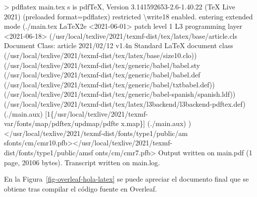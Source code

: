 \documentclass[
  letterpaper,
  DIV=11,
  numbers=noendperiod]{scrreport}
\newenvironment{Shaded}{\begin{snugshade}}{\end{snugshade}}
\newcommand{\BuiltInTok}[1]{\textcolor[rgb]{0.00,0.23,0.31}{#1}}
\newcommand{\DataTypeTok}[1]{\textcolor[rgb]{0.68,0.00,0.00}{#1}}
\newcommand{\ErrorTok}[1]{\textcolor[rgb]{0.68,0.00,0.00}{#1}}
\newcommand{\ExtensionTok}[1]{\textcolor[rgb]{0.00,0.23,0.31}{#1}}
\newcommand{\KeywordTok}[1]{\textcolor[rgb]{0.00,0.23,0.31}{#1}}
\newcommand{\NormalTok}[1]{\textcolor[rgb]{0.00,0.23,0.31}{#1}}
\newcommand{\OperatorTok}[1]{\textcolor[rgb]{0.37,0.37,0.37}{#1}}
\begin{document}
\begin{Shaded}
\begin{Highlighting}[]
\OperatorTok{\textgreater{}}\NormalTok{ pdflatex }\ExtensionTok{main.tex} 
\ExtensionTok{s}\NormalTok{ is pdfTeX, Version 3.141592653{-}2.6{-}1.40.22 }\ErrorTok{(}\ExtensionTok{TeX}\NormalTok{ Live 2021}\KeywordTok{)} \KeywordTok{(}\ExtensionTok{preloaded}\NormalTok{ format=pdflatex}\KeywordTok{)}
 \ExtensionTok{restricted} \DataTypeTok{\textbackslash{}w}\NormalTok{rite18 enabled.}
\ExtensionTok{entering}\NormalTok{ extended mode}
\KeywordTok{(}\ExtensionTok{./main.tex}
\ExtensionTok{LaTeX2e} \OperatorTok{\textless{}}\NormalTok{2021{-}06{-}01}\OperatorTok{\textgreater{}}\NormalTok{ patch level 1}
\ExtensionTok{L3}\NormalTok{ programming layer }\OperatorTok{\textless{}}\NormalTok{2021{-}06{-}18}\OperatorTok{\textgreater{}}
\KeywordTok{(}\ExtensionTok{/usr/local/texlive/2021/texmf{-}dist/tex/latex/base/article.cls}
\ExtensionTok{Document}\NormalTok{ Class: article 2021/02/12 v1.4n Standard LaTeX document class}
\KeywordTok{(}\ExtensionTok{/usr/local/texlive/2021/texmf{-}dist/tex/latex/base/size10.clo}\KeywordTok{))}
\KeywordTok{(}\ExtensionTok{/usr/local/texlive/2021/texmf{-}dist/tex/generic/babel/babel.sty}
\KeywordTok{(}\ExtensionTok{/usr/local/texlive/2021/texmf{-}dist/tex/generic/babel/babel.def}
\KeywordTok{(}\ExtensionTok{/usr/local/texlive/2021/texmf{-}dist/tex/generic/babel/txtbabel.def}\KeywordTok{))}
\KeywordTok{(}\ExtensionTok{/usr/local/texlive/2021/texmf{-}dist/tex/generic/babel{-}spanish/spanish.ldf}\KeywordTok{))}
\KeywordTok{(}\ExtensionTok{/usr/local/texlive/2021/texmf{-}dist/tex/latex/l3backend/l3backend{-}pdftex.def}\KeywordTok{)}
\KeywordTok{(}\ExtensionTok{./main.aux}\KeywordTok{)} \ExtensionTok{[1\{/usr/local/texlive/2021/texmf{-}var/fonts/map/pdftex/updmap/pdfte}
\ExtensionTok{x.map\}]} \ErrorTok{(}\ExtensionTok{./main.aux}\KeywordTok{)} \KeywordTok{)}\OperatorTok{\textless{}}\NormalTok{/usr/local/texlive/2021/texmf{-}dist/fonts/type1/public/am}
\ExtensionTok{sfonts/cm/cmr10.pfb}\OperatorTok{\textgreater{}\textless{}}\NormalTok{/usr/local/texlive/2021/texmf{-}dist/fonts/type1/public/amsf}
\ExtensionTok{onts/cm/cmr7.pfb}\OperatorTok{\textgreater{}}
\ExtensionTok{Output}\NormalTok{ written on main.pdf }\ErrorTok{(}\ExtensionTok{1}\NormalTok{ page, 20106 bytes}\KeywordTok{)}\BuiltInTok{.}
\ExtensionTok{Transcript}\NormalTok{ written on main.log.}
\end{Highlighting}
\end{Shaded}

En la Figura~\ref{fig-overleaf-hola-latex} se puede apreciar el
documento final que se obtiene tras compilar el código fuente en
Overleaf.
\end{document}
